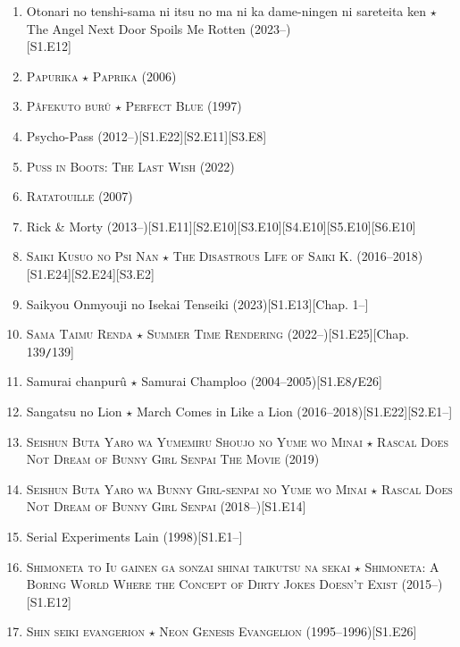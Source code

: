 \documentclass{article}
\begin{document}
\begin{enumerate}
    \item Otonari no tenshi-sama ni itsu no ma ni ka dame-ningen ni sareteita ken $\star$ The Angel Next Door Spoils Me Rotten (2023--)\\\mbox{}\hfill[S1.E12] 
    \item \textsc{Papurika $\star$ Paprika} (2006)
    \item \textsc{Pâfekuto burû $\star$ Perfect Blue} (1997)
    \item Psycho-Pass (2012--)\hfill[S1.E22][S2.E11][S3.E8]
    \item \textsc{Puss in Boots: The Last Wish} (2022)
    \item \textsc{Ratatouille} (2007)
    \item Rick \& Morty (2013--)\hfill[S1.E11][S2.E10][S3.E10][S4.E10][S5.E10][S6.E10]
    \item \textsc{Saiki Kusuo no Psi Nan $\star$ The Disastrous Life of Saiki K.} (2016--2018)\hfill[S1.E24][S2.E24][S3.E2]
    \item Saikyou Onmyouji no Isekai Tenseiki (2023)\hfill[S1.E13][Chap. 1--]
    \item \textsc{Sama Taimu Renda $\star$ Summer Time Rendering} (2022--)\hfill[S1.E25][Chap. 139\texttt{/}139]
    \item Samurai chanpurû $\star$ Samurai Champloo (2004--2005)\hfill[S1.E8\texttt{/}E26]
    \item Sangatsu no Lion $\star$ March Comes in Like a Lion (2016--2018)\hfill[S1.E22][S2.E1--]
    \item \textsc{Seishun Buta Yaro wa Yumemiru Shoujo no Yume wo Minai $\star$ Rascal Does Not Dream of Bunny Girl Senpai The Movie} (2019)
    \item \textsc{Seishun Buta Yaro wa Bunny Girl-senpai no Yume wo Minai $\star$ Rascal Does Not Dream of Bunny Girl Senpai} (2018--)\hfill[S1.E14]
    \item Serial Experiments Lain (1998)\hfill[S1.E1--]
    \item \textsc{Shimoneta to Iu gainen ga sonzai shinai taikutsu na sekai $\star$ Shimoneta: A Boring World Where the Concept of Dirty Jokes Doesn't Exist} (2015--)\hfill[S1.E12]
    \item \textsc{Shin seiki evangerion $\star$ Neon Genesis Evangelion} (1995--1996)\hfill[S1.E26]
    

\end{enumerate}
\end{document}
